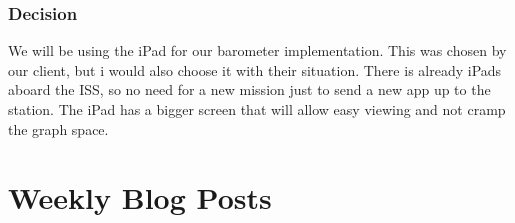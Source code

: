 \documentclass[onecolumn, draftclsnofoot,10pt, compsoc]{IEEEtran}
\begin{document}
\subsubsection{Decision}
We will be using the iPad for our barometer implementation.
 This was chosen by our client, but i would also choose it with their situation.
 There is already iPads aboard the ISS, so no need for a new mission just to send a new app up to the station.
The iPad has a bigger screen that will allow easy viewing and not cramp the graph space.

\newpage
\section{Weekly Blog Posts}
\end{document}
